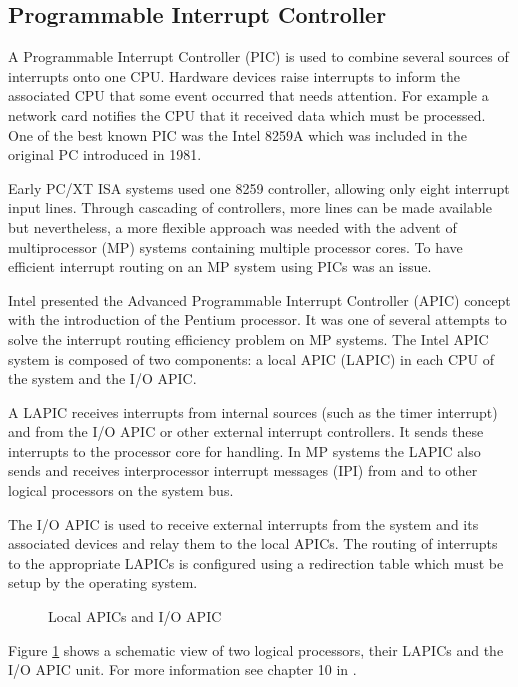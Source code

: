 \subsection{Programmable Interrupt Controller}\label{subsec:apic}
A Programmable Interrupt Controller (PIC) is used to combine several
sources of interrupts onto one CPU. Hardware devices raise interrupts to inform
the associated CPU that some event occurred that needs attention.  For example
a network card notifies the CPU that it received data which must be processed.
One of the best known PIC was the Intel 8259A which was included in the
original PC introduced in 1981.

Early PC/XT ISA systems used one 8259 controller, allowing only eight interrupt
input lines. Through cascading of controllers, more lines can be made available
but nevertheless, a more flexible approach was needed with the advent of
multiprocessor (MP) systems containing multiple processor cores. To
have efficient interrupt routing on an MP system using PICs was an issue.

Intel presented the Advanced Programmable Interrupt Controller
(APIC) concept with the introduction of the Pentium processor. It
was one of several attempts to solve the interrupt routing efficiency problem
on MP systems. The Intel APIC system is composed of two components: a local
APIC (LAPIC) in each CPU of the system and the I/O APIC.

A LAPIC receives interrupts from internal sources (such as the timer interrupt)
and from the I/O APIC or other external interrupt controllers. It sends these
interrupts to the processor core for handling. In MP systems the LAPIC also
sends and receives interprocessor interrupt messages (IPI) from and
to other logical processors on the system bus.

The I/O APIC is used to receive external interrupts from the system and its
associated devices and relay them to the local APICs. The routing of interrupts
to the appropriate LAPICs is configured using a redirection table which must be
setup by the operating system.

\begin{figure}[h]
	\centering
	
	\caption{Local APICs and I/O APIC}
	\label{fig:apic}
\end{figure}

Figure \ref{fig:apic} shows a schematic view of two logical processors, their
LAPICs and the I/O APIC unit. For more information see chapter 10 in
\cite{IntelSDM}.

